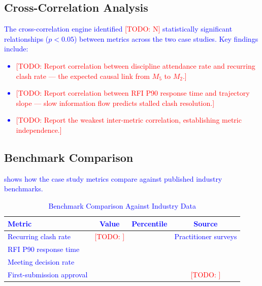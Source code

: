 \documentclass[conference]{IEEEtran}
\newcommand{\todo}[1]{\textcolor{red}{[TODO: #1]}}
\newcommand{\placeholder}[1]{\textcolor{blue}{#1}}
\begin{document}
\subsection{Cross-Correlation Analysis}
\placeholder{
The cross-correlation engine identified \todo{N} statistically significant relationships ($p < 0.05$) between metrics across the two case studies. Key findings include:

\begin{itemize}
    \item \todo{Report correlation between discipline attendance rate and recurring clash rate --- the expected causal link from $M_5$ to $M_2$.}
    \item \todo{Report correlation between RFI P90 response time and trajectory slope --- slow information flow predicts stalled clash resolution.}
    \item \todo{Report the weakest inter-metric correlation, establishing metric independence.}
\end{itemize}
}

\subsection{Benchmark Comparison}
\placeholder{
 shows how the case study metrics compare against published industry benchmarks.

\begin{table}[htbp]
    \centering
    \caption{Benchmark Comparison Against Industry Data}
    \label{tab:benchmarks}
    \begin{tabular}{lccc}
        \toprule
        Metric & Value & Percentile & Source \\
        \midrule
        Recurring clash rate    & \todo{} & & Practitioner surveys \\
        RFI P90 response time   & & & \cite{navigant2013} \\
        Meeting decision rate   & & & \cite{cavka2015} \\
        First-submission approval & & & \todo{} \\
        \bottomrule
    \end{tabular}
\end{table}
}
\end{document}
